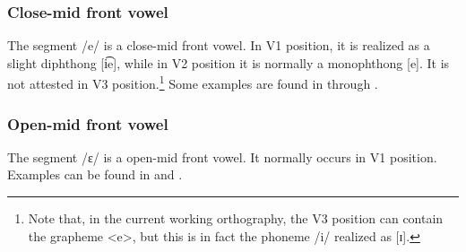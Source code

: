 \subsubsection{Close-mid front vowel}
The segment /e/ is a close-mid front vowel. In V1 position, it is realized as a slight diphthong [i͡e], while in V2 position it is normally a monophthong [e]. It is not attested in V3 position.\footnote{Note that, in the current working orthography, the V3 position can contain the grapheme <e>, but this is in fact the phoneme /i/ realized as [ɪ].} 
Some examples are found in  through .




\subsubsection{Open-mid front vowel}\label{openE}
The segment /ɛ/ is a open-mid front vowel. It normally occurs in V1 position. %
Examples can be found in  and .

